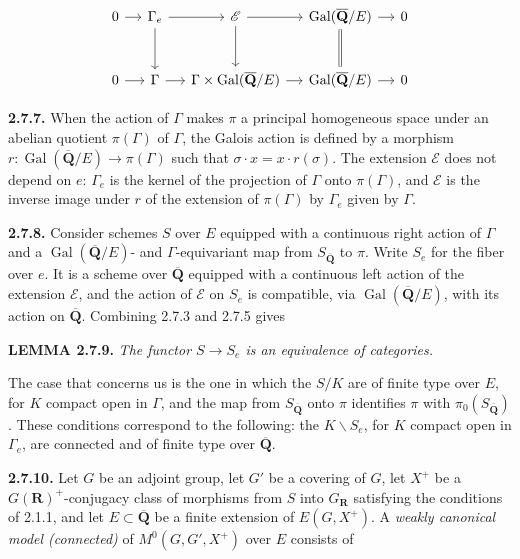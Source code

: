 \documentclass[10pt,a4paper]{article}
\begin{document}
\[
\begin{tikzcd}[column sep=small,row sep=large]
0 \arrow[r] & \Gamma_e \arrow[r] \arrow[d] & \mathscr E \arrow[r] \arrow[d] & \operatorname{Gal}(\overline{\mathbf Q}/E) \arrow[r] \arrow[d,equal] & 0 \\
0 \arrow[r] & \Gamma \arrow[r] & \Gamma\times\operatorname{Gal}(\overline{\mathbf Q}/E) \arrow[r] & \operatorname{Gal}(\overline{\mathbf Q}/E) \arrow[r] & 0
\end{tikzcd}
\]

\textbf{2.7.7.} When the action of \(\Gamma\) makes \(\pi\) a principal homogeneous space under an abelian quotient \(\pi(\Gamma)\) of \(\Gamma\), the Galois action is defined by a morphism \(r:\operatorname{Gal}(\overline{\mathbf Q}/E)\to\pi(\Gamma)\) such that \(\sigma\cdot x=x\cdot r(\sigma)\). The extension \(\mathscr E\) does not depend on \(e\): \(\Gamma_e\) is the kernel of the projection of \(\Gamma\) onto \(\pi(\Gamma)\), and \(\mathscr E\) is the inverse image under \(r\) of the extension of \(\pi(\Gamma)\) by \(\Gamma_e\) given by \(\Gamma\).

\textbf{2.7.8.} Consider schemes \(S\) over \(E\) equipped with a continuous right action of \(\Gamma\) and a \(\operatorname{Gal}(\overline{\mathbf Q}/E)\)- and \(\Gamma\)-equivariant map from \(S_{\overline{\mathbf Q}}\) to \(\pi\). Write \(S_e\) for the fiber over \(e\). It is a scheme over \(\overline{\mathbf Q}\) equipped with a continuous left action of the extension \(\mathscr E\), and the action of \(\mathscr E\) on \(S_e\) is compatible, via \(\operatorname{Gal}(\overline{\mathbf Q}/E)\), with its action on \(\overline{\mathbf Q}\). Combining 2.7.3 and 2.7.5 gives

\textbf{LEMMA 2.7.9.} \emph{The functor \(S\to S_e\) is an equivalence of categories.}

The case that concerns us is the one in which the \(S/K\) are of finite type over \(E\), for \(K\) compact open in \(\Gamma\), and the map from \(S_{\overline{\mathbf Q}}\) onto \(\pi\) identifies \(\pi\) with \(\pi_0(S_{\overline{\mathbf Q}})\). These conditions correspond to the following: the \(K\backslash S_e\), for \(K\) compact open in \(\Gamma_e\), are connected and of finite type over \(\overline{\mathbf Q}\).

\textbf{2.7.10.} Let \(G\) be an adjoint group, let \(G'\) be a covering of \(G\), let \(X^+\) be a \(G(\mathbf R)^+\)-conjugacy class of morphisms from \(S\) into \(G_{\mathbf R}\) satisfying the conditions of 2.1.1, and let \(E\subset\overline{\mathbf Q}\) be a finite extension of \(E(G,X^+)\). A \emph{weakly canonical model (connected)} of \(M^0(G,G',X^+)\) over \(E\) consists of
\end{document}

